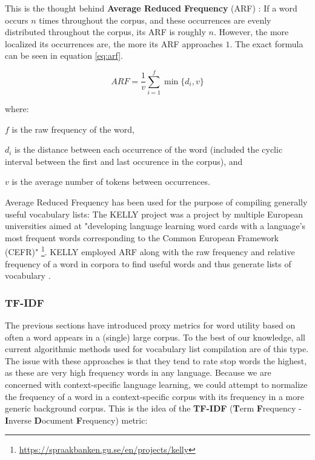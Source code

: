 This is the thought behind \textbf{Average Reduced Frequency} (ARF) \cite{savickyMeasuresWordCommonness2002}:
If a word occurs $n$ times throughout the corpus, and these occurrences are evenly distributed throughout the corpus, its ARF is roughly $n$.
However, the more localized its occurrences are, the more its ARF approaches $1$.
The exact formula can be seen in equation \ref{eq:arf}.

\begin{equation}\label{eq:arf}
	ARF = \frac{1}{v}\sum_{i=1}^{f} \min\{d_i,v\}
\end{equation}

where:

$f$ is the raw frequency of the word,

$d_i$ is the distance between each occurrence of the word (included the cyclic interval between the first and last occurence in the corpus), and

$v$ is the average number of tokens between occurrences.

Average Reduced Frequency has been used for the purpose of compiling generally useful vocabulary lists:
The KELLY project was a project by multiple European universities aimed at "developing language learning word cards with a language's most frequent words corresponding to the Common European Framework (CEFR)" \footnote{\url{https://spraakbanken.gu.se/en/projects/kelly}}.
KELLY employed ARF along with the raw frequency and relative frequency of a word in corpora to find useful words and thus generate lists of vocabulary \cite{kokkinakisCorpusbasedApproachesCreation2011}.

\subsubsection {TF-IDF}
The previous sections have introduced proxy metrics for word utility based on often a word appears in a (single) large corpus.
To the best of our knowledge, all current algorithmic methods used for vocabulary list compilation are of this type.
The issue with these approaches is that they tend to rate stop words the highest, as these are very high frequency words in any language.
Because we are concerned with context-specific language learning, we could attempt to normalize the frequency of a word in a context-specific corpus with its frequency in a more generic background corpus.
This is the idea of the \textbf{TF-IDF} (\textbf{T}erm \textbf{F}requency - \textbf{I}nverse \textbf{D}ocument \textbf{F}requency)
\cite{qaiserTextMiningUse2018} metric:

